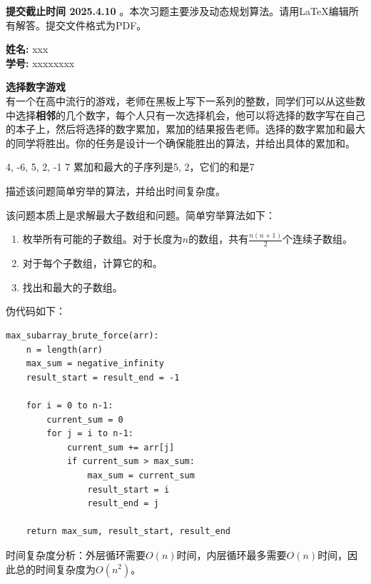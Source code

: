 \documentclass[12pt,twoside]{article}
\newcommand{\releasedate}{2025.4.3}
\newcommand{\partaduedate}{ 2025.4.10}
\newcommand{\theproblemsetnum}{}
\begin{document}
\handout{实验 - 动态规划算法}{\releasedate}
\textbf{提交截止时间 {\bf \partaduedate} }。本次习题主要涉及动态规划算法。请用\LaTeX 编辑所有解答。提交文件格式为PDF。

\setlength{\parindent}{0pt}
\medskip\hrulefill\medskip

{\bf 姓名:} xxx\\
{\bf 学号:} xxxxxxxx

\medskip

\medskip\hrulefill


\begin{problems}

\problem \textbf{选择数字游戏}\\
有一个在高中流行的游戏，老师在黑板上写下一系列的整数，同学们可以从这些数中选择{\bf 相邻}的几个数字，每个人只有一次选择机会，他可以将选择的数字写在自己的本子上，然后将选择的数字累加，累加的结果报告老师。选择的数字累加和最大的同学将胜出。你的任务是设计一个确保能胜出的算法，并给出具体的累加和。
\begin{probexamples}
   {4, -6, 5, 2, -1}
   {7}
   {累加和最大的子序列是5, 2，它们的和是7}
\end{probexamples}
\bparts
\ppart 描述该问题简单穷举的算法，并给出时间复杂度。

该问题本质上是求解最大子数组和问题。简单穷举算法如下：
\begin{enumerate}
    \item 枚举所有可能的子数组。对于长度为$n$的数组，共有$\frac{n(n+1)}{2}$个连续子数组。
    \item 对于每个子数组，计算它的和。
    \item 找出和最大的子数组。
\end{enumerate}

伪代码如下：
\begin{verbatim}
max_subarray_brute_force(arr):
    n = length(arr)
    max_sum = negative_infinity
    result_start = result_end = -1
    
    for i = 0 to n-1:
        current_sum = 0
        for j = i to n-1:
            current_sum += arr[j]
            if current_sum > max_sum:
                max_sum = current_sum
                result_start = i
                result_end = j
    
    return max_sum, result_start, result_end
\end{verbatim}

时间复杂度分析：外层循环需要$O(n)$时间，内层循环最多需要$O(n)$时间，因此总的时间复杂度为$O(n^2)$。


\end{problems}
\end{document}
